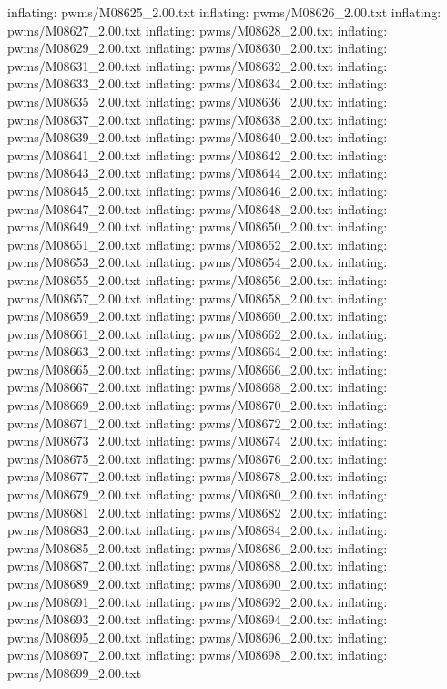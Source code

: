 \documentclass[letterpaper,10pt,english]{sphinxmanual}
\begin{document}
{\begin{sphinxVerbatim}[commandchars=\\\{\}]
  inflating: pwms/M08625\_2.00.txt
  inflating: pwms/M08626\_2.00.txt
  inflating: pwms/M08627\_2.00.txt
  inflating: pwms/M08628\_2.00.txt
  inflating: pwms/M08629\_2.00.txt
  inflating: pwms/M08630\_2.00.txt
  inflating: pwms/M08631\_2.00.txt
  inflating: pwms/M08632\_2.00.txt
  inflating: pwms/M08633\_2.00.txt
  inflating: pwms/M08634\_2.00.txt
  inflating: pwms/M08635\_2.00.txt
  inflating: pwms/M08636\_2.00.txt
  inflating: pwms/M08637\_2.00.txt
  inflating: pwms/M08638\_2.00.txt
  inflating: pwms/M08639\_2.00.txt
  inflating: pwms/M08640\_2.00.txt
  inflating: pwms/M08641\_2.00.txt
  inflating: pwms/M08642\_2.00.txt
  inflating: pwms/M08643\_2.00.txt
  inflating: pwms/M08644\_2.00.txt
  inflating: pwms/M08645\_2.00.txt
  inflating: pwms/M08646\_2.00.txt
  inflating: pwms/M08647\_2.00.txt
  inflating: pwms/M08648\_2.00.txt
  inflating: pwms/M08649\_2.00.txt
  inflating: pwms/M08650\_2.00.txt
  inflating: pwms/M08651\_2.00.txt
  inflating: pwms/M08652\_2.00.txt
  inflating: pwms/M08653\_2.00.txt
  inflating: pwms/M08654\_2.00.txt
  inflating: pwms/M08655\_2.00.txt
  inflating: pwms/M08656\_2.00.txt
  inflating: pwms/M08657\_2.00.txt
  inflating: pwms/M08658\_2.00.txt
  inflating: pwms/M08659\_2.00.txt
  inflating: pwms/M08660\_2.00.txt
  inflating: pwms/M08661\_2.00.txt
  inflating: pwms/M08662\_2.00.txt
  inflating: pwms/M08663\_2.00.txt
  inflating: pwms/M08664\_2.00.txt
  inflating: pwms/M08665\_2.00.txt
  inflating: pwms/M08666\_2.00.txt
  inflating: pwms/M08667\_2.00.txt
  inflating: pwms/M08668\_2.00.txt
  inflating: pwms/M08669\_2.00.txt
  inflating: pwms/M08670\_2.00.txt
  inflating: pwms/M08671\_2.00.txt
  inflating: pwms/M08672\_2.00.txt
  inflating: pwms/M08673\_2.00.txt
  inflating: pwms/M08674\_2.00.txt
  inflating: pwms/M08675\_2.00.txt
  inflating: pwms/M08676\_2.00.txt
  inflating: pwms/M08677\_2.00.txt
  inflating: pwms/M08678\_2.00.txt
  inflating: pwms/M08679\_2.00.txt
  inflating: pwms/M08680\_2.00.txt
  inflating: pwms/M08681\_2.00.txt
  inflating: pwms/M08682\_2.00.txt
  inflating: pwms/M08683\_2.00.txt
  inflating: pwms/M08684\_2.00.txt
  inflating: pwms/M08685\_2.00.txt
  inflating: pwms/M08686\_2.00.txt
  inflating: pwms/M08687\_2.00.txt
  inflating: pwms/M08688\_2.00.txt
  inflating: pwms/M08689\_2.00.txt
  inflating: pwms/M08690\_2.00.txt
  inflating: pwms/M08691\_2.00.txt
  inflating: pwms/M08692\_2.00.txt
  inflating: pwms/M08693\_2.00.txt
  inflating: pwms/M08694\_2.00.txt
  inflating: pwms/M08695\_2.00.txt
  inflating: pwms/M08696\_2.00.txt
  inflating: pwms/M08697\_2.00.txt
  inflating: pwms/M08698\_2.00.txt
  inflating: pwms/M08699\_2.00.txt

\end{sphinxVerbatim}}
\end{document}
